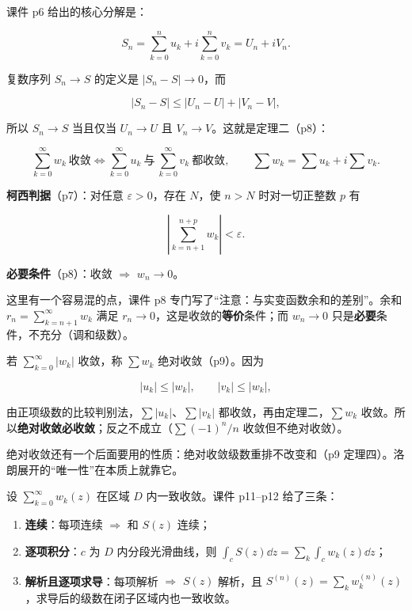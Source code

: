 \documentclass[11pt]{ctexart}
\let\origsubhdr\subhdr
\renewcommand{\subhdr}[1]{\par\needspace{4\baselineskip}\origsubhdr{#1}}
\begin{document}
课件 p6 给出的核心分解是：

\[ S_n=\sum_{k=0}^{n}u_k+i\sum_{k=0}^{n}v_k=U_n+iV_n . \]

复数序列 $S_n\to S$ 的定义是 $|S_n-S|\to 0$，而

\[ |S_n-S|\le|U_n-U|+|V_n-V| , \]

所以 $S_n\to S$ 当且仅当 $U_n\to U$ 且 $V_n\to V$。这就是定理二（p8）：

\[ \sum_{k=0}^{\infty}w_k\ \text{收敛}\iff\sum_{k=0}^{\infty}u_k\ \text{与}\ \sum_{k=0}^{\infty}v_k\ \text{都收敛},\qquad \sum w_k=\sum u_k+i\sum v_k . \]



\textbf{柯西判据}（p7）：对任意 $\varepsilon>0$，存在 $N$，使 $n>N$ 时对一切正整数 $p$ 有

\[ \left|\sum_{k=n+1}^{n+p}w_k\right|<\varepsilon . \]

\textbf{必要条件}（p8）：收敛 $\Rightarrow$ $w_n\to 0$。

这里有一个容易混的点，课件 p8 专门写了“注意：与实变函数余和的差别”。余和 $r_n=\sum_{k=n+1}^{\infty}w_k$ 满足 $r_n\to0$，这是收敛的\textbf{等价}条件；而 $w_n\to0$ 只是\textbf{必要}条件，不充分（调和级数）。


若 $\sum_{k=0}^{\infty}|w_k|$ 收敛，称 $\sum w_k$ 绝对收敛（p9）。因为

\[ |u_k|\le|w_k|,\qquad |v_k|\le|w_k| , \]

由正项级数的比较判别法，$\sum|u_k|$、$\sum|v_k|$ 都收敛，再由定理二，$\sum w_k$ 收敛。所以\textbf{绝对收敛必收敛}；反之不成立（$\sum(-1)^n/n$ 收敛但不绝对收敛）。

绝对收敛还有一个后面要用的性质：绝对收敛级数重排不改变和（p9 定理四）。洛朗展开的“唯一性”在本质上就靠它。


设 $\sum_{k=0}^{\infty}w_k(z)$ 在区域 $D$ 内一致收敛。课件 p11--p12 给了三条：

\begin{enumerate}
\item \textbf{连续}：每项连续 $\Rightarrow$ 和 $S(z)$ 连续；
\item \textbf{逐项积分}：$c$ 为 $D$ 内分段光滑曲线，则 $\int_c S(z)\dd z=\sum_k\int_c w_k(z)\dd z$；
\item \textbf{解析且逐项求导}：每项解析 $\Rightarrow$ $S(z)$ 解析，且 $S^{(n)}(z)=\sum_k w_k^{(n)}(z)$，求导后的级数在闭子区域内也一致收敛。
\end{enumerate}
\end{document}
